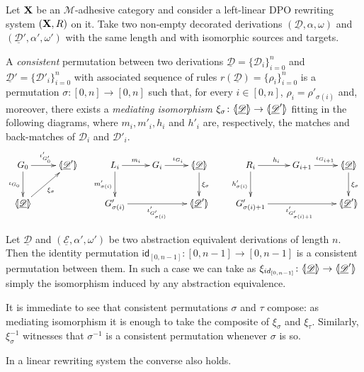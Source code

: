 \documentclass[a4paper,UKenglish,cleveref,pdftex,thm-restate,numberwithinsect,anonymous]{lipics}
\newcommand{\id}[1]{\mathsf{id}_{#1}}
\def\R{\mathsf{R}}
\def\X{\textbf {\textup{X}}}
\newcommand{\dder}[1]{\mathscr{#1}}
\newcommand{\der}[1]{\underline{\dder{#1}}}
\newcommand{\lpro}{\langle \hspace{-1.85pt}[}
\newcommand{\rpro}{]\hspace{-1.85pt}\rangle}
\newcommand{\tpro}[1]{\lpro \der{#1}\rpro}
\begin{document}
\begin{definition}
	\label{def:permcon}
	Let $\X$ be an $\mathcal{M}$-adhesive category and consider a
	left-linear DPO rewriting system $(\X, \R)$ on it.  Take two
	non-empty decorated derivations $(\der{D}, \alpha, \omega)$ and
	$(\der{D}', \alpha', \omega')$ with the same length and with
	isomorphic sources and targets.
	
	A \emph{consistent} permutation between two derivations $\der{D}=\{\dder{D}_i\}_{i=0}^n$ and
	$\der{D}'=\{\dder{D}'_i\}_{i=0}^n$ with associated sequence of rules
	$r(\der{D})=\{\rho_i\}_{i=0}^n$ is a permutation
	$\sigma\colon [0,n]\to [0,n]$ such that, for every $i\in [0,n]$,
	$\rho_i=\rho'_{\sigma(i)}$ and, moreover, there exists a
	\emph{mediating isomorphism}
	$\xi_\sigma\colon \tpro{D} \to \lpro \der{D}' \rpro$ fitting in the
	following diagrams, where $m_i, m'_i, h_i$ and $h'_i$ are,
	respectively, the matches and back-matches of $\dder{D}_i$ and
	$\dder{D}'_i$.
	\[
	\xymatrix{
		G_0 \ar[r]^{\iota'_{G'_0}} \ar[d]_{\iota_{G_0}}& \lpro \der{D}' \rpro &L_i\ar[r]^{m_i} \ar[d]_{m'_{\sigma(i)}}& G_i \ar[r]^{\iota_{G_i}}
		&\tpro{D} \ar[d]^{\xi_\sigma} & R_i \ar[r]^{h_i}
		\ar[d]_{h'_{\sigma(i)}}& G_{i+1} \ar[r]^{\iota_{G_{i+1}}}
		&\tpro{D} \ar[d]^{\xi_\sigma} \\\tpro{D} \ar[ur]_{\xi_\sigma}&&G'_{\sigma(i)}
		\ar[rr]_{\iota'_{G'_{\sigma(i)}}}&& \lpro \der{D}' \rpro&
		G'_{\sigma(i)+1} \ar[rr]_{\iota'_{G'_{\sigma(i)+1}}}&& \lpro
		\der{D}' \rpro}
	\]
\end{definition}


\begin{remark}\label{rem:abs}
	Let $\der{D}$ and $(\der{E}, \alpha', \omega')$ be two abstraction equivalent derivations of length $n$. Then the identity permutation $\id{[0,n-1]}\colon [0,n-1]\to [0,n-1]$ is a consistent permutation between them. In such a case we can take as $\xi_{\id{[0,n-1]}}\colon \tpro{D}\to \lpro \der{D}'\rpro$ simply the isomorphism induced by any abstraction equivalence.
\end{remark}

\begin{remark}\label{rem:compo}
	It is immediate to see that consistent permutations $\sigma$ and $\tau$ compose: as mediating isomorphism it is enough to take the composite of $\xi_{\sigma}$ and $\xi_\tau$. Similarly, $\xi^{-1}_{\sigma}$ witnesses that $\sigma^{-1}$ is a consistent permutation whenever $\sigma$ is so.
\end{remark}
In a linear rewriting system the converse also holds.
\end{document}
